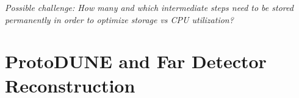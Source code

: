 \documentclass[../main-v1.tex]{subfiles}
\begin{document}
{\it Possible challenge:  How many and which intermediate steps need to be stored permanently in order to optimize storage vs CPU utilization?}



\section{ProtoDUNE and Far Detector Reconstruction }







    




\end{document}
